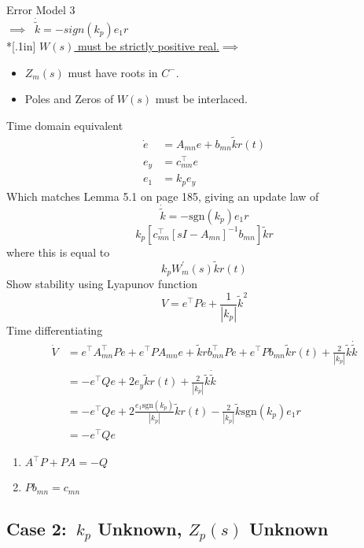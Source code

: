 Error Model 3  \\[.1in]
$\implies\;\; \dot{\tilde k} = - sign(k_p) e_1 r$\\*[.1in]
\underline{$W(s)$ must be strictly positive real.}$\implies$
\begin{itemize}
\item $Z_m(s)$ must have  roots in $C^{-}$.
\item Poles and Zeros of $W(s)$ must be interlaced.
\end{itemize}

Time domain equivalent
\begin{align*}
  \dot{e}&=A_{mn}e+b_{mn}\tilde{k}r(t) \\
  e_{y}&=c_{mn}^{\top}e \\
  e_{1}&=k_{p}e_{y}
\end{align*}
Which matches Lemma 5.1 on page 185, giving an update law of
\begin{equation*}
  \dot{\tilde{k}}=-\text{sgn}(k_{p})e_{1}r
\end{equation*}
\begin{equation*}
  k_{p}[c_{mn}^{\top}[sI-A_{mn}]^{-1}b_{mn}]\tilde{k}r
\end{equation*}
where this is equal to
\begin{equation*}
  k_{p}W_{m}^{\prime}(s)\tilde{k}r(t)
\end{equation*}
Show stability using Lyapunov function
\begin{equation*}
  V=e^{\top}Pe+\frac{1}{|k_{p}|}\tilde{k}^{2}
\end{equation*}
Time differentiating
\begin{align*}
  \dot{V}&=e^{\top}A_{mn}^{\top}Pe+e^{\top}PA_{mn}e+\tilde{k}rb_{mn}^{\top}Pe+e^{\top}Pb_{mn}\tilde{k}r(t)+\frac{2}{|k_{p}|}\tilde{k}\dot{\tilde{k}} \\
  &=-e^{\top}Qe+2e_{y}\tilde{k}r(t)+\frac{2}{|k_{p}|}\tilde{k}\dot{\tilde{k}} \\
  &=-e^{\top}Qe+2\frac{e_{1}\text{sgn}(k_{p})}{|k_{p}|}\tilde{k}r(t)-\frac{2}{|k_{p}|}\tilde{k}\text{sgn}(k_{p})e_{1}r \\
  &=-e^{\top}Qe
\end{align*}

\begin{enumerate}
  \setlength{\itemsep}{0pt}
  \item{$A^{\top}P+PA=-Q$}
  \item{$Pb_{mn}=c_{mn}$}
\end{enumerate}

\subsection{Case 2:\ \texorpdfstring{$k_{p}$}{kp} Unknown, \texorpdfstring{$Z_{p}(s)$}{Zp(s)} Unknown}

